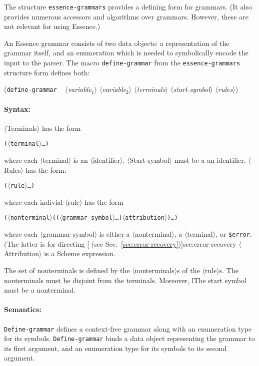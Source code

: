 \documentclass{article}
\newcommand{\meta}[1]{{\noindent\mbox{\textrm{$\langle$#1$\rangle$}}}}
\newcommand{\pproto}[2]{\unskip%
\mbox{\texonly{\spaceskip=0.5em}#1}%
\mbox{ }\texonly{\nobreak}\htmlonly{ }\textrm{#2}}
\newcommand{\proto}[3]{\par\bigskip\begin{flushleft}\pproto{(\texttt{#1}}{\textit{#2})}\hspace*{\fill}{#3}\end{flushleft}}
\newcommand{\dotsfoo}{\ldots\texonly{\thinspace}}
\newcommand{\codefont}[1]{\texttt{#1}}
\begin{document}
The structure \codefont{essence-grammars} provides a defining form for
grammars.  (It also provides numerous accessors and algorithms over
grammars.  However, these are not relevant for using Essence.)

An Essence grammar consists of two data objects: a representation of
the grammar itself, and an enumeration which is needed to symbolically encode the
input to the parser.  The macro \codefont{define-grammar} from the
\codefont{essence-grammars} structure form defines both:

\label{form:define-grammar}
\proto{define-grammar}{ \meta{variable$_1$} \meta{variable$_2$}\hfill\linebreak\texonly{\hspace*{1em}}
    \meta{terminals}
  \meta{start-symbol} \meta{rules}}{syntax}

\paragraph{Syntax:} \meta{Terminals} has the form
%
\begin{alltt}
  (\meta{terminal} \dotsfoo)
\end{alltt}
%
where each \meta{terminal} is an \meta{identifier}.  
\meta{Start-symbol} must
be a an identifier.  \meta{Rules} has the form:
%
\begin{alltt}
  (\meta{rule} \dotsfoo)
\end{alltt}
%
where each indivial \meta{rule} has the form
%
\begin{alltt}
  (\meta{nonterminal} ((\meta{grammar-symbol} \dotsfoo) \meta{attribution}) \dotsfoo)
\end{alltt}
%
where each \meta{grammar-symbol} is either a \meta{nonterminal}, a
\meta{terminal}, or \codefont{\$error}.  (The latter is for directing
[ (see
Sec.~\ref{sec:error-recovery})]{sec:error-recovery} \meta{Attribution}
is a Scheme expression.

The set of nonterminals is defined by the \meta{nonterminals}s of the
\meta{rule}s.  The nonterminals must be disjoint from the terminals.
Moreover, lThe start symbol must be a nonterminal.

\paragraph{Semantics:} \codefont{Define-grammar} defines a
context-free grammar along with an enumeration type for its symbols.
\codefont{Define-grammar} binds a data object representing the grammar 
to its first argument, and an enumeration type for its symbols to its
second argument.
\end{document}

